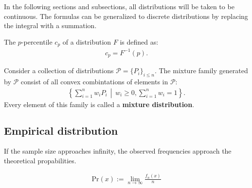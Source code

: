     In the following sections and subsections, all distributions will be taken to be continuous. The formulas can be generalized to discrete distributions by replacing the integral with a summation.

    \begin{definition}[Percentile]
        The $p$-percentile $c_p$ of a distribution $F$ is defined as:
        \begin{gather}
            c_p = F^{-1}(p).
        \end{gather}
    \end{definition}


    \begin{example}
        Consider a collection of distributions $\mathcal{P}=\{P_i\}_{i\leq n}$. The mixture family generated by $\mathcal{P}$ consist of all convex combintations of elements in $\mathcal{P}$:
        \begin{gather}
            \left\{\sum_{i=1}^nw_iP_i\,\middle\vert\,w_i\geq0,\sum_{i=1}^nw_i = 1\right\}.
        \end{gather}
        Every element of this family is called a \textbf{mixture distribution}.
    \end{example}

\subsection{Empirical distribution}


    \begin{theorem}\label{statistics:large_numbers}
        If the sample size approaches infinity, the observed frequencies approach the theoretical propabilities.
    \end{theorem}
    \begin{result}
        \begin{gather}
            \label{statistics:frequentist_probability}
            \mathrm{Pr}(x) := \lim_{n\rightarrow\infty}\frac{f_n(x)}{n}
        \end{gather}
    \end{result}


